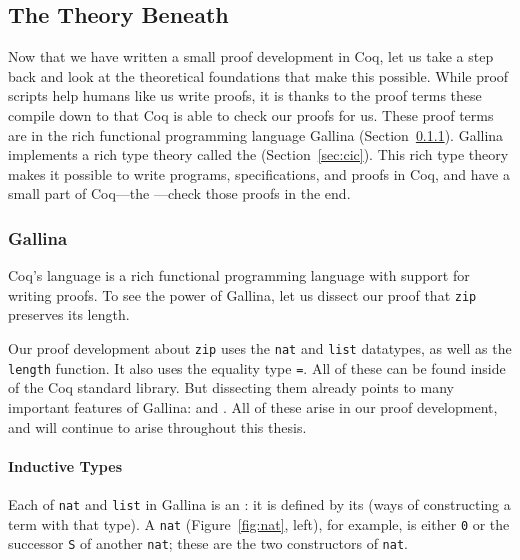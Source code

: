 \subsection{The Theory Beneath}
\label{sec:mot-theory}

Now that we have written a small proof development in Coq, let us take a step back and look at the theoretical foundations that make this possible.
While proof scripts help humans like us write proofs, it is thanks to the proof terms these compile down to that Coq is able to check our proofs for us.
These proof terms are in the rich functional programming language Gallina (Section~\ref{sec:gallina}).
Gallina implements a rich type theory called the  (Section~\ref{sec:cic}).
This rich type theory makes it possible to write programs, specifications, and proofs in Coq,
and have a small part of Coq---the ---check those proofs in the end.

\subsubsection{Gallina}
\label{sec:gallina}

Coq's  language  is a rich functional programming language with support for writing proofs.
To see the power of Gallina, let us dissect our proof that \lstinline{zip} preserves its length.

Our proof development about \lstinline{zip} uses the \lstinline{nat} and \lstinline{list} datatypes,
as well as the \lstinline{length} function.
It also uses the equality type \lstinline{=}.
All of these can be found inside of the Coq standard library.
But dissecting them already points to many important features of Gallina:
 and .
All of these arise in our proof development, and will continue to arise throughout this thesis.

\paragraph{Inductive Types}

Each of \lstinline{nat} and \lstinline{list} in Gallina is an :
it is defined by its  (ways of constructing a term with that type).
A \lstinline{nat} (Figure~\ref{fig:nat}, left), for example,
is either \lstinline{0} or the successor \lstinline{S} of another \lstinline{nat};
these are the two constructors of \lstinline{nat}.

